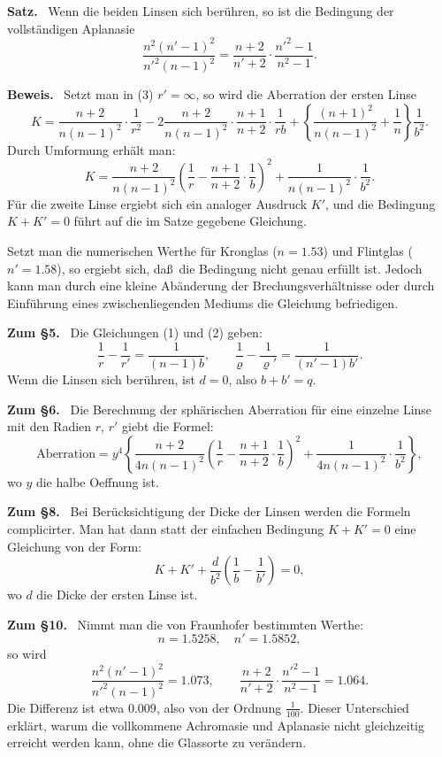\documentclass[12pt,a4paper]{article}
\theoremstyle{plain}
\theoremstyle{definition}
\theoremstyle{remark}
\begin{document}
\medskip

\textbf{Satz.} \ Wenn die beiden Linsen sich ber\"uhren, so ist die
Bedingung der vollst\"andigen Aplanasie
\[
\frac{n^{2}(n'-1)^{2}}{n'^{2}(n-1)^{2}} =
\frac{n+2}{n'+2}\cdot\frac{n'^{2}-1}{n^{2}-1}.
\]

\textbf{Beweis.} \ Setzt man in (3) $r' = \infty$, so wird die
Aberration der ersten Linse
\[
K = \frac{n+2}{n(n-1)^{2}}\cdot\frac{1}{r^{2}}
- 2\frac{n+2}{n(n-1)^{2}}\cdot\frac{n+1}{n+2}\cdot\frac{1}{rb}
+ \left\{\frac{(n+1)^{2}}{n(n-1)^{2}} + \frac{1}{n}\right\}\frac{1}{b^{2}}.
\]
Durch Umformung erh\"alt man:
\[
K = \frac{n+2}{n(n-1)^{2}}\left(\frac{1}{r} - \frac{n+1}{n+2}\cdot\frac{1}{b}\right)^{2}
+ \frac{1}{n(n-1)^{2}}\cdot\frac{1}{b^{2}}.
\]
F\"ur die zweite Linse ergiebt sich ein analoger Ausdruck $K'$, und
die Bedingung $K + K' = 0$ f\"uhrt auf die im Satze gegebene
Gleichung.

\medskip

Setzt man die numerischen Werthe f\"ur Kronglas ($n = 1.53$) und
Flintglas ($n' = 1.58$), so ergiebt sich, da\ss\ die Bedingung nicht
genau erf\"ullt ist. Jedoch kann man durch eine kleine Ab\"anderung
der Brechungsverh\"altnisse oder durch Einf\"uhrung eines
zwischenliegenden Mediums die Gleichung befriedigen.

\medskip

\textbf{Zum \S 5.} \ Die Gleichungen (1) und (2) geben:
\[
\frac{1}{r} - \frac{1}{r'} = \frac{1}{(n-1)b},\qquad
\frac{1}{\varrho} - \frac{1}{\varrho'} = \frac{1}{(n'-1)b'}.
\]
Wenn die Linsen sich ber\"uhren, ist $d = 0$, also $b + b' = q$.

\textbf{Zum \S 6.} \ Die Berechnung der sph\"arischen Aberration f\"ur
eine einzelne Linse mit den Radien $r$, $r'$ giebt die Formel:
\[
\text{Aberration} =
y^{4}\left\{\frac{n+2}{4n(n-1)^{2}}\left(\frac{1}{r} - \frac{n+1}{n+2}\cdot\frac{1}{b}\right)^{2}
+ \frac{1}{4n(n-1)^{2}}\cdot\frac{1}{b^{2}}\right\},
\]
wo $y$ die halbe Oeffnung ist.

\textbf{Zum \S 8.} \ Bei Ber\"ucksichtigung der Dicke der Linsen
werden die Formeln complicirter. Man hat dann statt der einfachen
Bedingung $K + K' = 0$ eine Gleichung von der Form:
\[
K + K' + \frac{d}{b^{2}}\left(\frac{1}{b} - \frac{1}{b'}\right) = 0,
\]
wo $d$ die Dicke der ersten Linse ist.

\textbf{Zum \S 10.} \ Nimmt man die von {\sc Fraunhofer} bestimmten
Werthe:
\[
n = 1.5258,\quad n' = 1.5852,
\]
so wird
\[
\frac{n^{2}(n'-1)^{2}}{n'^{2}(n-1)^{2}} = 1.073,\qquad
\frac{n+2}{n'+2}\cdot\frac{n'^{2}-1}{n^{2}-1} = 1.064.
\]
Die Differenz ist etwa $0.009$, also von der Ordnung $\frac{1}{100}$.
Dieser Unterschied erkl\"art, warum die vollkommene Achromasie und
Aplanasie nicht gleichzeitig erreicht werden kann, ohne die
Glassorte zu ver\"andern.
\end{document}
